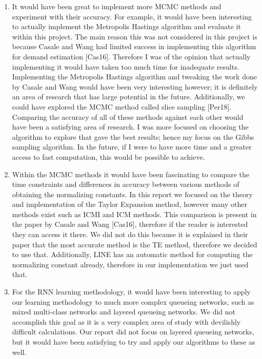 \documentclass[a4paper,11pt,titlepage]{article}
\begin{document}
\begin{enumerate}
    \item It would have been great to implement more MCMC methods and experiment with their accuracy. For example, it would have been interesting to actually implement the Metropolis Hastings algorithm and evaluate it within this project. The main reason this was not considered in this project is because Casale and Wang had limited success in implementing this algorithm for demand estimation [Cas16]. Therefore I was of the opinion that actually implementing it would have taken too much time for inadequate results. Implementing the Metropolis Hastings algorithm and tweaking the work done by Casale and Wang would have been very interesting however; it is definitely an area of research that has large potential in the future. Additionally, we could have explored the MCMC method called slice sampling [Per18]. Comparing the accuracy of all of these methods against each other would have been a satisfying area of research. I was more focused on choosing the algorithm to explore that gave the best results; hence my focus on the Gibbs sampling algorithm. In the future, if I were to have more time and a greater access to fast computation, this would be possible to achieve. 
    \item Within the MCMC methods it would have been fascinating to compare the time constraints and differences in accuracy between various methods of obtaining the normalizing constants. In this report we focused on the theory and implementation of the Taylor Expansion method, however many other methods exist such as ICMI and ICM methods. This comparison is present in the paper by Casale and Wang [Cas16], therefore if the reader is interested they can access it there. We did not do this because it is explained in their paper that the most accurate method is the TE method, therefore we decided to use that. Additionally, LINE has an automatic method for computing the normalizing constant already, therefore in our implementation we just used that. 
    \item For the RNN learning methodology, it would have been interesting to apply our learning methodology to much more complex queueing networks, such as mixed multi-class networks and layered queueing networks. We did not accomplish this goal as it is a very complex area of study with devilishly difficult calculations. Our report did not focus on layered queueing networks, but it would have been satisfying to try and apply our algorithms to these as well. 

\end{enumerate}
\end{document}
